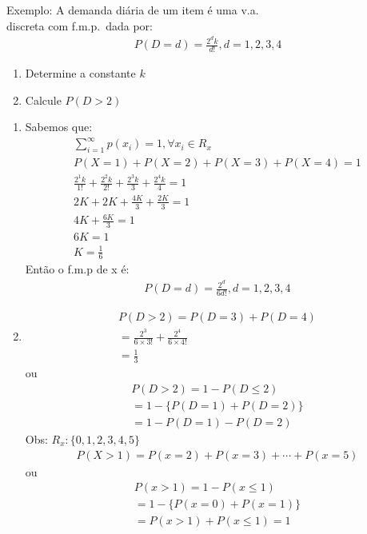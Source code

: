 \documentclass[11pt,a4paper]{article}
\begin{document}
Exemplo: A demanda diária de um item é uma v.a.\\ discreta com f.m.p.\ dada por: 
\begin{align}
  P(D=d)=\frac{2^d k}{d!}, d=1,2,3,4
\end{align}
\begin{enumerate}[label=(\alph*)]
  \item Determine a constante $k$
  \item Calcule $P(D>2)$
\end{enumerate}
\begin{enumerate}[label=(\alph*)]
  \item Sabemos que: 
    \begin{align}
      \sum^{\infty}_{i=1} p(x_i)=1, \forall x_i \in R_{x}\\
      P(X=1)+P(X=2)+P(X=3)+P(X=4)=1\\
      \frac{2^1 k}{1!}+\frac{2^2 k}{2!}+\frac{2^3 k}{3\!}+\frac{2^4 k}{4\!}=1\\
      2K + 2K+ \frac{4K}{3}+\frac{2K}{3}=1 \\
      4K+\frac{6K}{3}=1 \\
      6K=1\\
      K=\frac{1}{6}
    \end{align}
    Então o f.m.p de x é: 
    \begin{align}
      P(D=d)=\frac{2^d}{6d!}, d=1,2,3,4
    \end{align}
  \item 
    \begin{align}
      P(D>2)=P(D=3)+P(D=4)\\
      =\frac{2^3}{6\times 3!}+ \frac{2^4}{6\times 4!}\\
      =\frac{1}{3}
    \end{align}
    ou 
    \begin{align}
      P(D>2)=1-P(D\le 2)\\
      = 1- \{ P(D=1)+ P(D=2) \}\\
      = 1- P(D=1)- P(D=2)
    \end{align}
    Obs: $R_{x}: \{0,1,2,3,4,5 \}$
    \begin{align}
      P(X>1)=P(x=2)+ P(x=3)+\cdots+P(x=5)
    \end{align}
    ou
    \begin{align}
      P(x>1)= 1-P(x\le 1)\\
      = 1- \{ P(x=0)+ P(x=1) \}\\
      = P(x>1)+ P(x\le 1)=1
    \end{align}
\end{enumerate}
\end{document}
